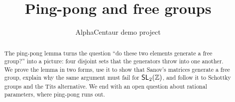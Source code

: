 \documentclass[11pt]{amsart}
\title{Ping-pong and free groups}
\author{AlphaCentaur demo project}
\theoremstyle{plain}
\theoremstyle{definition}
\theoremstyle{remark}
\begin{document}
\begin{abstract}
The ping-pong lemma turns the question ``do these two elements generate a free
group?'' into a picture: four disjoint sets that the generators throw into one
another. We prove the lemma in two forms, use it to show that Sanov's matrices
generate a free group, explain why the same argument must fail for
$\mathsf{SL}_2(\mathbb{Z})$, and follow it to Schottky groups and the Tits alternative. We end
with an open question about rational parameters, where ping-pong runs out.
\end{abstract}

\maketitle











\end{document}
